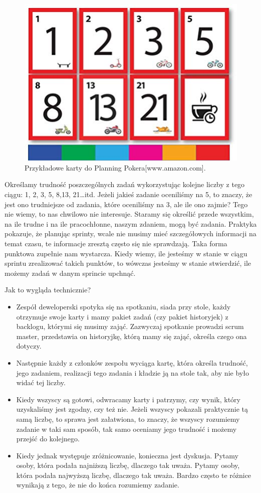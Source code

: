 \begin{figure}
	\centering\includegraphics[width=.4\textwidth]{img/Planning_Poker}
	\caption{Przykładowe karty do Planning Pokera[www.amazon.com].}\label{rysunek:poker}
\end{figure}

Określamy trudność poszczególnych zadań wykorzystując kolejne liczby z tego ciągu: 1, 2, 3, 5, 8,13, 21…itd.
Jeżeli jakieś zadanie oceniliśmy na 5, to znaczy, że jest ono trudniejsze od zadania, które oceniliśmy na 3,
ale ile ono zajmie? Tego nie wiemy, to nas chwilowo nie interesuje.
Staramy się określić przede wszystkim, na ile trudne i na ile pracochłonne, naszym zdaniem, mogą być zadania.
Praktyka pokazuje, że planując sprinty,
wcale nie musimy mieć szczegółowych informacji na temat czasu,
te informacje zresztą często się nie sprawdzają.
Taka forma punktowa zupełnie nam wystarcza. Kiedy wiemy,
ile jesteśmy w stanie w ciągu sprintu zrealizować takich punktów, to wówczas jesteśmy w stanie stwierdzić,
ile możemy zadań w danym sprincie upchnąć.

Jak to wygląda technicznie?

\begin{itemize}
	\item Zespół deweloperski spotyka się na spotkaniu, siada przy stole,
	każdy otrzymuje swoje karty i mamy pakiet zadań (czy pakiet historyjek) z backlogu, którymi się musimy zająć.
	Zazwyczaj spotkanie prowadzi scrum master, przedstawia on historyjkę, którą mamy się zająć, określa czego ona dotyczy.
	\item Następnie każdy z członków zespołu wyciąga kartę, która określa trudność, jego zadaniem,
	realizacji tego zadania i kładzie ją na stole tak, aby nie było widać tej liczby.
	\item Kiedy wszyscy są gotowi, odwracamy karty i patrzymy, czy wynik, który uzyskaliśmy jest zgodny,
	czy też nie. Jeżeli wszyscy pokazali praktycznie tą samą liczbę, to sprawa jest załatwiona,
	to znaczy, że wszyscy rozumiemy zadanie w taki sam sposób, tak samo oceniamy jego trudność i możemy przejść do kolejnego. 
	\item Kiedy jednak występuje zróżnicowanie, konieczna jest dyskusja.
	Pytamy osoby, która podała najniższą liczbę, dlaczego tak uważa.
	Pytamy osoby, która podała najwyższą liczbę, dlaczego tak uważa.
	Bardzo często te różnice wynikają z tego, że nie do końca rozumiemy zadanie.
\end{itemize}

